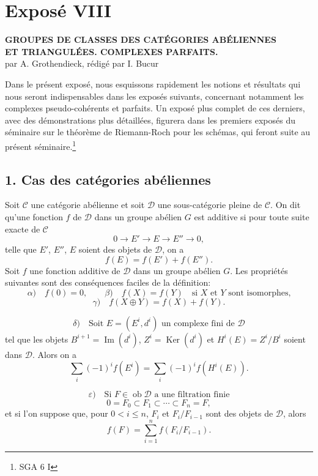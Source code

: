 \documentclass[11pt]{article}
\providecommand{\Ob}{\operatorname{ob}}
\providecommand{\cC}{\mathcal C}
\providecommand{\Ob}{\operatorname{ob}}
\providecommand{\cC}{\mathcal C}
\providecommand{\cD}{\mathcal D}
\providecommand{\Ob}{\operatorname{Ob}}
\providecommand{\Ob}{\operatorname{ob}}
\begin{document}
\newpage
\section*{Exposé VIII}

\begin{center}
\textbf{GROUPES DE CLASSES DES CATÉGORIES ABÉLIENNES}\\
\textbf{ET TRIANGULÉES. COMPLEXES PARFAITS.}\\[1ex]
par A. Grothendieck, rédigé par I. Bucur
\end{center}

Dans le présent exposé, nous esquissons rapidement les notions et résultats qui nous seront indispensables dans les exposés suivants, concernant notamment les complexes pseudo-cohérents et parfaits. Un exposé plus complet de ces derniers, avec des démonstrations plus détaillées, figurera dans les premiers exposés du séminaire sur le théorème de Riemann-Roch pour les schémas, qui feront suite au présent séminaire.\footnote{SGA 6 I}

\subsection*{1. Cas des catégories abéliennes}

Soit $\cC$ une catégorie abélienne et soit $\cD$ une sous-catégorie pleine de $\cC$. On dit qu'une fonction $f$ de $\cD$ dans un groupe abélien $G$ est additive si pour toute suite exacte de $\cC$
\[
0\longrightarrow E'\longrightarrow E\longrightarrow E''\longrightarrow 0,
\]
telle que $E'$, $E''$, $E$ soient des objets de $\cD$, on a
\[
f(E)=f(E')+f(E'').
\]
Soit $f$ une fonction additive de $\cD$ dans un groupe abélien $G$. Les propriétés suivantes sont des conséquences faciles de la définition:
\[
\alpha)\quad f(0)=0,\qquad
\beta)\quad f(X)=f(Y)\quad\text{si }X\text{ et }Y\text{ sont isomorphes,}
\]
\[
\gamma)\quad f(X\oplus Y)=f(X)+f(Y).
\]

\[
\delta)\quad
\text{Soit }E=(E^i,d^i)\text{ un complexe fini de }\cD
\]
tel que les objets $B^{i+1}=\operatorname{Im}(d^i)$, $Z^i=\operatorname{Ker}(d^i)$ et $H^i(E)=Z^i/B^i$ soient dans $\cD$. Alors on a
\[
\sum_i (-1)^i f(E^i)=\sum_i (-1)^i f(H^i(E)).
\]

\[
\varepsilon)\quad
\text{Si }F\in\Ob \cD\text{ a une filtration finie}
\]
\[
0=F_0\subset F_1\subset\cdots\subset F_n=F,
\]
et si l'on suppose que, pour $0<i\le n$, $F_i$ et $F_i/F_{i-1}$ sont des objets de $\cD$, alors
\[
f(F)=\sum_{i=1}^n f(F_i/F_{i-1}).
\]
\end{document}
